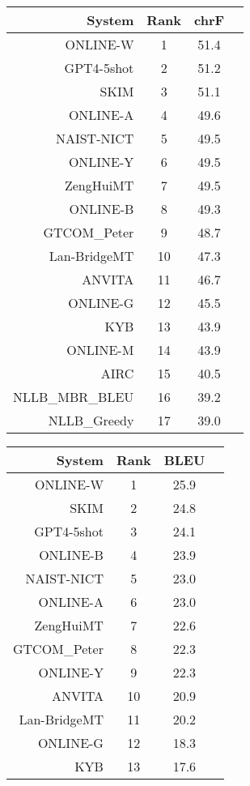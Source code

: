 \documentclass[11pt]{article}
\begin{document}
\begin{table}  
\scriptsize\begin{subtable}[t]{0.33\textwidth}
\begin{tabular}{rccc}
\toprule 
System & Rank & chrF \\ 
\midrule 
ONLINE-W & 1 & 51.4 \\ 
GPT4-5shot & 2 & 51.2 \\ 
SKIM & 3 & 51.1 \\ 
ONLINE-A & 4 & 49.6 \\ 
NAIST-NICT & 5 & 49.5 \\ 
ONLINE-Y & 6 & 49.5 \\ 
ZengHuiMT & 7 & 49.5 \\ 
ONLINE-B & 8 & 49.3 \\ 
GTCOM\_Peter & 9 & 48.7 \\ 
Lan-BridgeMT & 10 & 47.3 \\ 
ANVITA & 11 & 46.7 \\ 
ONLINE-G & 12 & 45.5 \\ 
KYB & 13 & 43.9 \\ 
ONLINE-M & 14 & 43.9 \\ 
AIRC & 15 & 40.5 \\ 
NLLB\_MBR\_BLEU & 16 & 39.2 \\ 
NLLB\_Greedy & 17 & 39.0 \\ 
\bottomrule 
\end{tabular} 
\end{subtable} 
\begin{subtable}[t]{0.33\textwidth}
\begin{tabular}{rccc}
\toprule 
System & Rank & BLEU \\ 
\midrule 
ONLINE-W & 1 & 25.9 \\ 
SKIM & 2 & 24.8 \\ 
GPT4-5shot & 3 & 24.1 \\ 
ONLINE-B & 4 & 23.9 \\ 
NAIST-NICT & 5 & 23.0 \\ 
ONLINE-A & 6 & 23.0 \\ 
ZengHuiMT & 7 & 22.6 \\ 
GTCOM\_Peter & 8 & 22.3 \\ 
ONLINE-Y & 9 & 22.3 \\ 
ANVITA & 10 & 20.9 \\ 
Lan-BridgeMT & 11 & 20.2 \\ 
ONLINE-G & 12 & 18.3 \\ 
KYB & 13 & 17.6 \\ 

\end{tabular}
\end{subtable}
\end{table}
\end{document}
